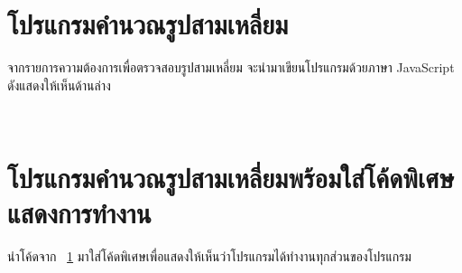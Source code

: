 \documentclass[12pt,a4paper]{article}
\begin{document}
% 
% 
% 
\section[โปรแกรมคำนวณรูปสามเหลี่ยม]{โปรแกรมคำนวณรูปสามเหลี่ยม}
\label{sec:trianglecal}
จากรายการความต้องการเพื่อตรวจสอบรูปสามเหลี่ยม จะนำมาเขียนโปรแกรมด้วยภาษา JavaScript ดังแสดงให้เห็นด้านล่าง


\vfill
\noindent\sitdhibong\, \studentid \newline
\myprogram\, \newline
\department\, \faculty

\newpage
\clearpage
\section[โปรแกรมคำนวณรูปสามเหลี่ยมใส่คำอธิบาย]{โปรแกรมคำนวณรูปสามเหลี่ยมพร้อมใส่โค้ดพิเศษแสดงการทำงาน}
\label{sec:trianglecalinstrumented}
นำโค้ดจาก \numbername~\ref{sec:trianglecal} มาใส่โค้ดพิเศษเพื่อแสดงให้เห็นว่าโปรแกรมได้ทำงานทุกส่วนของโปรแกรม

\end{document}
